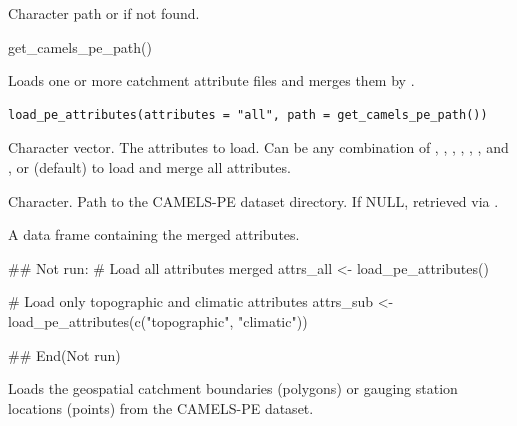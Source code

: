 \documentclass[a4paper]{book}
\begin{document}
%
\begin{Value}
Character path or  if not found.
\end{Value}
%
\begin{Examples}
\begin{ExampleCode}
get_camels_pe_path()
\end{ExampleCode}
\end{Examples}
%
\begin{Description}
Loads one or more catchment attribute files and merges them by .
\end{Description}
%
\begin{Usage}
\begin{verbatim}
load_pe_attributes(attributes = "all", path = get_camels_pe_path())
\end{verbatim}
\end{Usage}
%
\begin{Arguments}
\begin{ldescription}
\item[\code{attributes}] Character vector. The attributes to load. Can be any combination of
, , , , , ,
and , or  (default) to load and merge all attributes.

\item[\code{path}] Character. Path to the CAMELS-PE dataset directory. If NULL,
retrieved via .
\end{ldescription}
\end{Arguments}
%
\begin{Value}
A data frame containing the merged attributes.
\end{Value}
%
\begin{Examples}
\begin{ExampleCode}
## Not run: 
# Load all attributes merged
attrs_all <- load_pe_attributes()

# Load only topographic and climatic attributes
attrs_sub <- load_pe_attributes(c("topographic", "climatic"))

## End(Not run)
\end{ExampleCode}
\end{Examples}
%
\begin{Description}
Loads the geospatial catchment boundaries (polygons) or gauging station locations (points)
from the CAMELS-PE dataset.
\end{Description}
\end{document}
